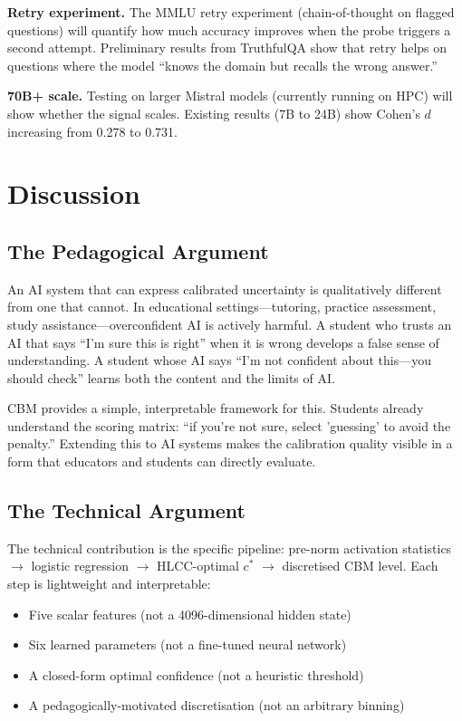 \documentclass[11pt,a4paper]{article}
\begin{document}
\textbf{Retry experiment.}
The MMLU retry experiment (chain-of-thought on flagged questions) will quantify how much accuracy improves when the probe triggers a second attempt.
Preliminary results from TruthfulQA show that retry helps on questions where the model ``knows the domain but recalls the wrong answer.''

\textbf{70B+ scale.}
Testing on larger Mistral models (currently running on HPC) will show whether the signal scales.
Existing results (7B to 24B) show Cohen's $d$ increasing from 0.278 to 0.731.

\section{Discussion}

\subsection{The Pedagogical Argument}

An AI system that can express calibrated uncertainty is qualitatively different from one that cannot.
In educational settings---tutoring, practice assessment, study assistance---overconfident AI is actively harmful.
A student who trusts an AI that says ``I'm sure this is right'' when it is wrong develops a false sense of understanding.
A student whose AI says ``I'm not confident about this---you should check'' learns both the content and the limits of AI.

CBM provides a simple, interpretable framework for this.
Students already understand the scoring matrix: ``if you're not sure, select 'guessing' to avoid the penalty.''
Extending this to AI systems makes the calibration quality visible in a form that educators and students can directly evaluate.

\subsection{The Technical Argument}

The technical contribution is the specific pipeline: pre-norm activation statistics $\to$ logistic regression $\to$ HLCC-optimal $c^*$ $\to$ discretised CBM level.
Each step is lightweight and interpretable:
\begin{itemize}
    \item Five scalar features (not a 4096-dimensional hidden state)
    \item Six learned parameters (not a fine-tuned neural network)
    \item A closed-form optimal confidence (not a heuristic threshold)
    \item A pedagogically-motivated discretisation (not an arbitrary binning)
\end{itemize}
\end{document}
